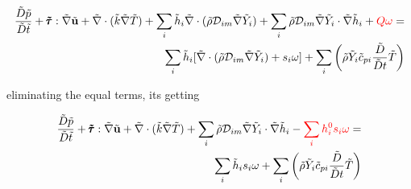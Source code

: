 \documentclass[preprint,12pt,authoryear]{elsarticle}
\begin{document}
\begin{equation}
\begin{split}
        \frac{\tilde{D} \tilde{p}}{\tilde{D}\tilde{t}}
        +       
        \pmb{\tilde{\tau}}:\tilde{\nabla} \tilde{\mathbf{u}} 
        + 
        \tilde{\nabla} \cdot (\tilde{k}\tilde{\nabla} \tilde{T})
        +
        \sum\limits_i
        \tilde{h}_i
        \tilde{\nabla}\cdot
	(
	\tilde{\rho}\mathcal{D}_{im}\tilde{\nabla}\tilde{Y}_i
	)
        +
        \sum\limits_i 
        \tilde{\rho}
        \mathcal{D}_{im}
        \tilde{\nabla}
        \tilde{Y}_i     
        \cdot
        \tilde{\nabla} 
        \tilde{h}_i
        +
        {\color{red} Q\omega}
        =
\\
        \sum\limits_i
        \tilde{h}_i
        [
        	\tilde{\nabla}\cdot
		(
		\tilde{\rho}\mathcal{D}_{im}\tilde{\nabla}\tilde{Y}_i
		)
		+
        	s_i \omega
	    ]
        +
        \sum\limits_i
        \left(
                \tilde{\rho}
                \tilde{Y}_i
                \tilde{c}_{pi}
                \frac{\tilde{D}}{\tilde{D} t}
                \tilde{T}
        \right)
\end{split}
\end{equation}

eliminating the equal terms, its getting  

\begin{equation}
\begin{split}
        \frac{\tilde{D} \tilde{p}}{\tilde{D}\tilde{t}}
        +       
        \pmb{\tilde{\tau}}:\tilde{\nabla} \tilde{\mathbf{u}} 
        + 
        \tilde{\nabla} \cdot (\tilde{k}\tilde{\nabla} \tilde{T})
        +
        \sum\limits_i 
        \tilde{\rho}
        \mathcal{D}_{im}
        \tilde{\nabla}
        \tilde{Y}_i     
        \cdot
        \tilde{\nabla} 
        \tilde{h}_i
        -
        {\color{red} \sum_i h_i^0 s_i\omega}
        =
        \\
        \sum\limits_i
        \tilde{h}_i
        s_i  \omega
	+
        \sum\limits_i
        \left(
                \tilde{\rho}
                \tilde{Y}_i
                \tilde{c}_{pi}
                \frac{\tilde{D}}{\tilde{D} t}
                \tilde{T}
        \right)
\end{split}
\end{equation}
\end{document}
